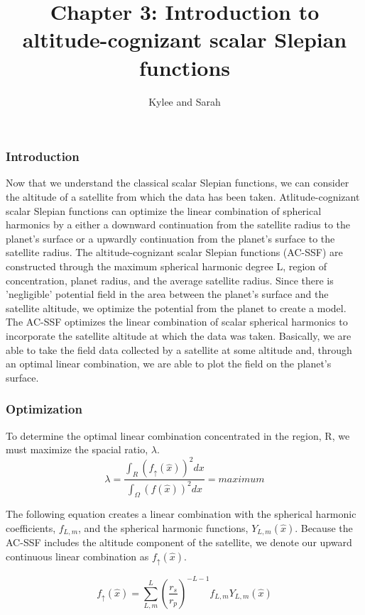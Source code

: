 \documentclass[11pt]{article}
\title{Chapter 3: Introduction to altitude-cognizant scalar Slepian functions}
\author{Kylee and  Sarah}
\begin{document}
\maketitle


\subsubsection*{Introduction}

Now that we understand the classical scalar Slepian functions, we can consider the altitude of a satellite from which the data has been taken.   Atlitude-cognizant scalar Slepian functions can optimize the linear combination of spherical harmonics by a either a downward continuation from the satellite radius to the planet's surface or a upwardly continuation from the planet's surface to the satellite radius.  The altitude-cognizant scalar Slepian functions (AC-SSF) are constructed through the maximum spherical harmonic degree L, region of concentration, planet radius, and the average satellite radius.  Since there is 'negligible' potential field in the area between the planet's surface and the satellite altitude, we optimize the potential from the planet to create a model.  The AC-SSF optimizes the linear combination of scalar spherical harmonics to incorporate the satellite altitude at which the data was taken.  Basically, we are able to take the field data collected by a satellite at some altitude and, through an optimal linear combination, we are able to plot the field on the planet's surface. 
\\

\subsubsection*{Optimization}

To determine the optimal linear combination concentrated in the region, R, we must maximize the spacial ratio, $\lambda$.  
$$\lambda = \frac{\int_R(f_\uparrow(\hat{x}))^2dx}{\int_\Omega(f(\hat{x}))^2dx} = maximum$$


The following equation creates a linear combination with the spherical harmonic coefficients, $f_{L,m}$, and the spherical harmonic functions, $Y_{L,m}(\hat{x})$.  Because the AC-SSF includes the altitude component of the satellite, we denote our upward continuous linear combination as $f_\uparrow(\hat{x})$. 
 
$$f_\uparrow(\hat{x}) = \sum_{L,m}^{L}{(\frac{r_s}{r_p})^{-L-1}f_{L,m}Y_{L,m}(\hat{x})}$$
\end{document}
